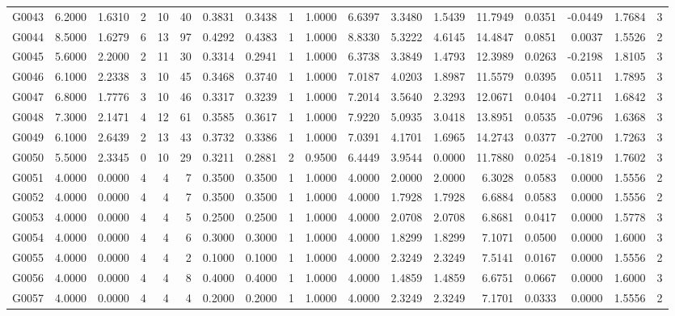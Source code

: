 \begin{tabular}{lrrrrrrrrrrrrrrrrr}
G0043 & 6.2000 & 1.6310 & 2 & 10 & 40 & 0.3831 & 0.3438 & 1 & 1.0000 & 6.6397 & 3.3480 & 1.5439 & 11.7949 & 0.0351 & -0.0449 & 1.7684 & 3 \\
G0044 & 8.5000 & 1.6279 & 6 & 13 & 97 & 0.4292 & 0.4383 & 1 & 1.0000 & 8.8330 & 5.3222 & 4.6145 & 14.4847 & 0.0851 & 0.0037 & 1.5526 & 2 \\
G0045 & 5.6000 & 2.2000 & 2 & 11 & 30 & 0.3314 & 0.2941 & 1 & 1.0000 & 6.3738 & 3.3849 & 1.4793 & 12.3989 & 0.0263 & -0.2198 & 1.8105 & 3 \\
G0046 & 6.1000 & 2.2338 & 3 & 10 & 45 & 0.3468 & 0.3740 & 1 & 1.0000 & 7.0187 & 4.0203 & 1.8987 & 11.5579 & 0.0395 & 0.0511 & 1.7895 & 3 \\
G0047 & 6.8000 & 1.7776 & 3 & 10 & 46 & 0.3317 & 0.3239 & 1 & 1.0000 & 7.2014 & 3.5640 & 2.3293 & 12.0671 & 0.0404 & -0.2711 & 1.6842 & 3 \\
G0048 & 7.3000 & 2.1471 & 4 & 12 & 61 & 0.3585 & 0.3617 & 1 & 1.0000 & 7.9220 & 5.0935 & 3.0418 & 13.8951 & 0.0535 & -0.0796 & 1.6368 & 3 \\
G0049 & 6.1000 & 2.6439 & 2 & 13 & 43 & 0.3732 & 0.3386 & 1 & 1.0000 & 7.0391 & 4.1701 & 1.6965 & 14.2743 & 0.0377 & -0.2700 & 1.7263 & 3 \\
G0050 & 5.5000 & 2.3345 & 0 & 10 & 29 & 0.3211 & 0.2881 & 2 & 0.9500 & 6.4449 & 3.9544 & 0.0000 & 11.7880 & 0.0254 & -0.1819 & 1.7602 & 3 \\
G0051 & 4.0000 & 0.0000 & 4 & 4 & 7 & 0.3500 & 0.3500 & 1 & 1.0000 & 4.0000 & 2.0000 & 2.0000 & 6.3028 & 0.0583 & 0.0000 & 1.5556 & 2 \\
G0052 & 4.0000 & 0.0000 & 4 & 4 & 7 & 0.3500 & 0.3500 & 1 & 1.0000 & 4.0000 & 1.7928 & 1.7928 & 6.6884 & 0.0583 & 0.0000 & 1.5556 & 2 \\
G0053 & 4.0000 & 0.0000 & 4 & 4 & 5 & 0.2500 & 0.2500 & 1 & 1.0000 & 4.0000 & 2.0708 & 2.0708 & 6.8681 & 0.0417 & 0.0000 & 1.5778 & 3 \\
G0054 & 4.0000 & 0.0000 & 4 & 4 & 6 & 0.3000 & 0.3000 & 1 & 1.0000 & 4.0000 & 1.8299 & 1.8299 & 7.1071 & 0.0500 & 0.0000 & 1.6000 & 3 \\
G0055 & 4.0000 & 0.0000 & 4 & 4 & 2 & 0.1000 & 0.1000 & 1 & 1.0000 & 4.0000 & 2.3249 & 2.3249 & 7.5141 & 0.0167 & 0.0000 & 1.5556 & 2 \\
G0056 & 4.0000 & 0.0000 & 4 & 4 & 8 & 0.4000 & 0.4000 & 1 & 1.0000 & 4.0000 & 1.4859 & 1.4859 & 6.6751 & 0.0667 & 0.0000 & 1.6000 & 3 \\
G0057 & 4.0000 & 0.0000 & 4 & 4 & 4 & 0.2000 & 0.2000 & 1 & 1.0000 & 4.0000 & 2.3249 & 2.3249 & 7.1701 & 0.0333 & 0.0000 & 1.5556 & 2 \\

\end{tabular}
